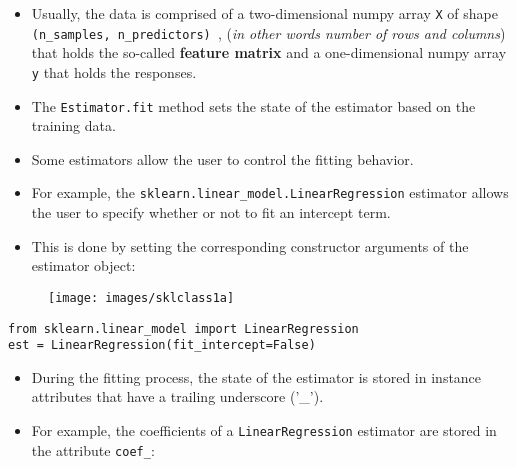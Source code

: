 \documentclass[SKL-MASTER.tex]{subfiles}
\begin{document}
\begin{itemize}
\item Usually, the data is comprised of a two-dimensional numpy array \texttt{X} of shape \texttt{(n\_samples, n\_predictors) }, (\textit{in other words number of rows and columns}) that holds the so-called \textbf{feature matrix} and a one-dimensional numpy array \texttt{y} that holds the responses. 
\item The \texttt{Estimator.fit} method sets the state of the estimator based on the training data. 

\item Some estimators allow the user to control the fitting behavior. 
\end{itemize}


\newpage
\LARGE
	\begin{itemize}
		\item For example, the \texttt{sklearn.linear\_model.LinearRegression} estimator allows the user to specify whether or not to fit an intercept term. 
\item This is done by setting the corresponding constructor arguments of the estimator object:
\end{itemize}
	\begin{figure}[h!]
\centering
\texttt{[image: images/sklclass1a]}

\end{figure}

\large
\begin{framed}
\begin{verbatim}
from sklearn.linear_model import LinearRegression
est = LinearRegression(fit_intercept=False)
\end{verbatim}
\end{framed}

\newpage
\LARGE
\begin{itemize}
\item During the fitting process, the state of the estimator is stored in instance attributes that have a trailing underscore ('\_'). 
\item For example, the coefficients of a \texttt{LinearRegression} estimator are stored in the attribute \texttt{coef\_}:
\end{itemize}
\end{document}
